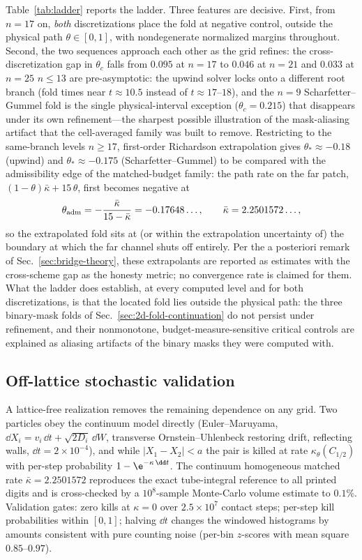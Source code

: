 Table~\ref{tab:ladder} reports the ladder. Three features are decisive.
First, from \(n=17\) on, \emph{both} discretizations place the fold at
negative control, outside the physical path \(\theta\in[0,1]\), with
nondegenerate normalized margins throughout. Second, the two sequences
approach each other as the grid refines: the cross-discretization gap in
\(\theta_c\) falls from \(0.095\) at \(n=17\) to \(0.046\) at \(n=21\) and
\(0.033\) at \(n=25\)%
\(n\le13\) are pre-asymptotic: the upwind solver locks onto a different
root branch (fold times near \(t\approx10.5\) instead of
\(t\approx17\)--\(18\)), and the \(n=9\) Scharfetter--Gummel fold is the
single physical-interval exception (\(\theta_c=0.215\)) that disappears
under its own refinement---the sharpest possible illustration of the
mask-aliasing artifact that the cell-averaged family was built to remove.
Restricting to the same-branch levels \(n\ge17\), first-order Richardson
extrapolation gives \(\theta_*\approx-0.18\) (upwind) and
\(\theta_*\approx-0.175\) (Scharfetter--Gummel)%
to be compared with the admissibility edge of the matched-budget family:
the path rate on the far patch, \((1-\theta)\bar\kappa+15\,\theta\),
first becomes negative at
\[
\theta_{\rm adm}
=-\frac{\bar\kappa}{15-\bar\kappa}
=-0.17648\ldots,
\qquad \bar\kappa=2.2501572\ldots,
\]
so the extrapolated fold sits at (or within the extrapolation uncertainty
of) the boundary at which the far channel shuts off entirely. Per the a
posteriori remark of Sec.~\ref{sec:bridge-theory}, these extrapolants are
reported as estimates with the cross-scheme gap as the honesty metric; no
convergence rate is claimed for them. What the ladder does establish, at
every computed level and for both discretizations, is that the located
fold lies outside the physical path: the three binary-mask folds of
Sec.~\ref{sec:2d-fold-continuation} do not persist under refinement, and
their nonmonotone, budget-measure-sensitive critical controls are
explained as aliasing artifacts of the binary masks they were computed
with.

\subsection{Off-lattice stochastic validation}
\label{sec:offlattice}

A lattice-free realization removes the remaining dependence on any grid.
Two particles obey the continuum model directly
(Euler--Maruyama, \(\dd X_i=v_i\,\dd t+\sqrt{2D_i}\,\dd W\),
transverse Ornstein--Uhlenbeck restoring drift, reflecting walls,
\(\dd t=2\times10^{-4}\)), and while \(|X_1-X_2|<a\) the pair is killed at
rate \(\kappa_\theta(C_{1/2})\) with per-step probability
\(1-\e^{-\kappa\,\dd t}\). The continuum homogeneous matched rate
\(\bar\kappa=2.2501572\) reproduces the exact tube-integral reference to
all printed digits and is cross-checked by a \(10^8\)-sample Monte-Carlo
volume estimate to \(0.1\%\). Validation gates: zero kills at
\(\kappa=0\) over \(2.5\times10^7\) contact steps; per-step kill
probabilities within \([0,1]\); halving \(\dd t\) changes the windowed
histograms by amounts consistent with pure counting noise (per-bin
\(z\)-scores with mean square \(0.85\)--\(0.97\)).

